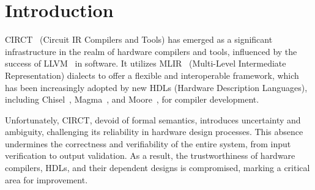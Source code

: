 \section{Introduction}

CIRCT~\ToCite{} (Circuit IR Compilers and Tools) has emerged as a significant infrastructure in the realm of hardware compilers and tools, influenced by the success of LLVM~\ToCite{} in software. It utilizes MLIR~\ToCite{} (Multi-Level Intermediate Representation) dialects to offer a flexible and interoperable framework, which has been increasingly adopted by new HDLs (Hardware Description Languages), including Chisel~\ToCite{}, Magma~\ToCite{}, and Moore~\ToCite{}, for compiler development. 

Unfortunately, CIRCT, devoid of formal semantics, introduces uncertainty and ambiguity, challenging its reliability in hardware design processes. This absence undermines the correctness and verifiability of the entire system, from input verification to output validation. As a result, the trustworthiness of hardware compilers, HDLs, and their dependent designs is compromised, marking a critical area for improvement.



